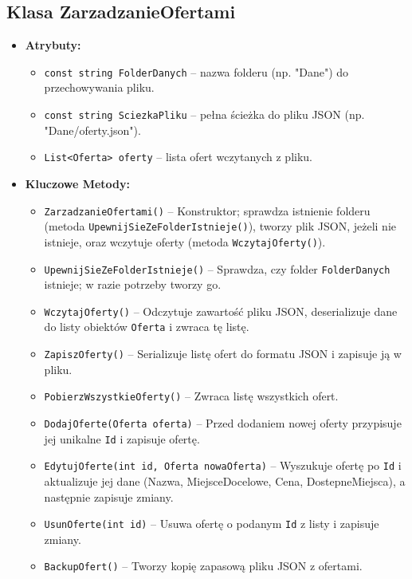 \subsection*{Klasa \textbf{ZarzadzanieOfertami}}
\begin{itemize}
    \item \textbf{Atrybuty:}
    \begin{itemize}
        \item \texttt{const string FolderDanych} -- nazwa folderu (np. "Dane") do przechowywania pliku.
        \item \texttt{const string SciezkaPliku} -- pełna ścieżka do pliku JSON (np. "Dane/oferty.json").
        \item \texttt{List<Oferta> oferty} -- lista ofert wczytanych z pliku.
    \end{itemize}
    \item \textbf{Kluczowe Metody:}
    \begin{itemize}
        \item \texttt{ZarzadzanieOfertami()} -- Konstruktor; sprawdza istnienie folderu (metoda \texttt{UpewnijSieZeFolderIstnieje()}), tworzy plik JSON, jeżeli nie istnieje, oraz wczytuje oferty (metoda \texttt{WczytajOferty()}).
        \item \texttt{UpewnijSieZeFolderIstnieje()} -- Sprawdza, czy folder \texttt{FolderDanych} istnieje; w razie potrzeby tworzy go.
        \item \texttt{WczytajOferty()} -- Odczytuje zawartość pliku JSON, deserializuje dane do listy obiektów \texttt{Oferta} i zwraca tę listę.
        \item \texttt{ZapiszOferty()} -- Serializuje listę ofert do formatu JSON i zapisuje ją w pliku.
        \item \texttt{PobierzWszystkieOferty()} -- Zwraca listę wszystkich ofert.
        \item \texttt{DodajOferte(Oferta oferta)} -- Przed dodaniem nowej oferty przypisuje jej unikalne \texttt{Id} i zapisuje ofertę.
        \item \texttt{EdytujOferte(int id, Oferta nowaOferta)} -- Wyszukuje ofertę po \texttt{Id} i aktualizuje jej dane (Nazwa, MiejsceDocelowe, Cena, DostepneMiejsca), a następnie zapisuje zmiany.
        \item \texttt{UsunOferte(int id)} -- Usuwa ofertę o podanym \texttt{Id} z listy i zapisuje zmiany.
        \item \texttt{BackupOfert()} -- Tworzy kopię zapasową pliku JSON z ofertami.
    \end{itemize}
\end{itemize}

